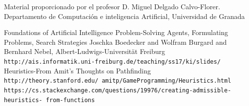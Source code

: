 \documentclass[12pt]{article}
\begin{document}
\begin{thebibliography}{9}
Material proporcionado por el profesor
D. Miguel Delgado Calvo-Florer. Departamento de Computación e inteligencia Artificial, Universidad de Granada
 
Foundations of Artificial Intelligence
Problem-Solving Agents, Formulating Problems, Search Strategies
Joschka Boedecker and Wolfram Burgard and Bernhard Nebel, Albert-Ludwigs-Universität Freiburg
\texttt{http://ais.informatik.uni-freiburg.de/teaching/ss17/ki/slides/}
  Heuristics-From Amit’s Thoughts on Pathfinding\\
  \texttt{http://theory.stanford.edu/~amitp/GameProgramming/Heuristics.html}
  \texttt{https://cs.stackexchange.com/questions/19976/creating-admissible-heuristics-
    from-functions}
\end{thebibliography}
\end{document}
